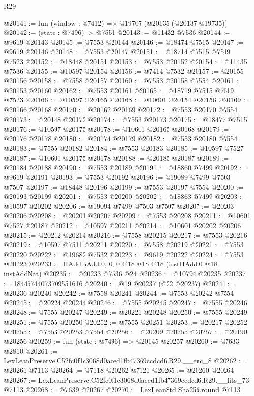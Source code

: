 \begin{lexlean}{R29}
\begin{coremodule}
@20141 := fun (window : @7412) => @19707 (@20135 (@20137 @19735))
@20142 := (state : @7496) -> @7551
@20143 := @11432 @7536
@20144 := @9619 @20143
@20145 := @7553 @20144
@20146 := @18474 @7515
@20147 := @9619 @20146
@20148 := @7553 @20147
@20151 := @18714 @7515 @7519 @7523
@20152 := @18448 @20151
@20153 := @7553 @20152
@20154 := @11435 @7536
@20155 := @10597 @20154
@20156 := @7414 @7532
@20157 := @20155 @20156
@20158 := @7558 @20157
@20160 := @7553 @20158 @7554
@20161 := @20153 @20160
@20162 := @7553 @20161
@20165 := @18719 @7515 @7519 @7523
@20166 := @10597 @20165
@20168 := @10601 @20154 @20156
@20169 := @20166 @20168
@20170 := @20162 @20169
@20172 := @7553 @20170 @7554
@20173 := @20148 @20172
@20174 := @7553 @20173
@20175 := @18477 @7515
@20176 := @10597 @20175
@20178 := @10601 @20165 @20168
@20179 := @20176 @20178
@20180 := @20174 @20179
@20182 := @7553 @20180 @7554
@20183 := @7555 @20182
@20184 := @7553 @20183
@20185 := @10597 @7527
@20187 := @10601 @20175 @20178
@20188 := @20185 @20187
@20189 := @20184 @20188
@20190 := @7553 @20189
@20191 := @18860 @7499
@20192 := @9619 @20191
@20193 := @7553 @20192
@20196 := @19089 @7499 @7503 @7507
@20197 := @18448 @20196
@20199 := @7553 @20197 @7554
@20200 := @20193 @20199
@20201 := @7553 @20200
@20202 := @18863 @7499
@20203 := @10597 @20202
@20206 := @19094 @7499 @7503 @7507
@20207 := @20203 @20206
@20208 := @20201 @20207
@20209 := @7553 @20208
@20211 := @10601 @7527 @20187
@20212 := @10597 @20211
@20214 := @10601 @20202 @20206
@20215 := @20212 @20214
@20216 := @7558 @20215
@20217 := @7553 @20216
@20219 := @10597 @7511 @20211
@20220 := @7558 @20219
@20221 := @7553 @20220
@20222 := @19682 @7532
@20223 := @9619 @20222
@20224 := @7553 @20223
@20233 := HAdd.hAdd.{0, 0, 0} @18 @18 @18 (instHAdd.{0} @18 instAddNat)
@20235 := @20233 @7536 @24
@20236 := @10794 @20235
@20237 := 18446744073709551616
@20240 := @19 @20237 (@22 @20237)
@20241 := @20236 @20240
@20242 := @7558 @20241
@20244 := @7553 @20242 @7554
@20245 := @20224 @20244
@20246 := @7555 @20245
@20247 := @7555 @20246
@20248 := @7555 @20247
@20249 := @20221 @20248
@20250 := @7555 @20249
@20251 := @7555 @20250
@20252 := @7555 @20251
@20253 := @20217 @20252
@20255 := @7553 @20253 @7554
@20256 := @20209 @20255
@20257 := @20190 @20256
@20259 := fun (state : @7496) => @20145 @20257
@20260 := @7633 @2810
@20261 := LexLeanPreserve.C52fc0f1c3068d0aced1fb47369ccdcd6.R29.__enc_8
@20262 := @20261 @7113
@20264 := @7118 @20262 @7121
@20265 := @20260 @20264
@20267 := LexLeanPreserve.C52fc0f1c3068d0aced1fb47369ccdcd6.R29.__fits_73 @7113
@20268 := @7639 @20267
@20270 := LexLeanStd.Sha256.round @7113

\end{coremodule}
\end{lexlean}
